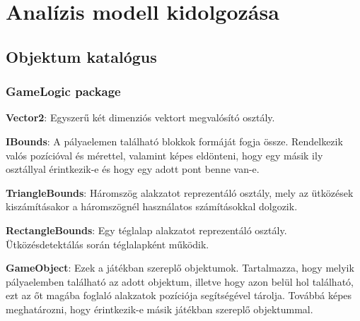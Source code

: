 


\setcounter{section}{3}




\fedlap

\section{Analízis modell kidolgozása}

\subsection{Objektum katalógus}

\subsubsection{GameLogic package}

\textbf{Vector2}: Egyszerű két dimenziós vektort megvalósító osztály.

\textbf{IBounds}: A pályaelemen található blokkok formáját fogja össze. Rendelkezik valós pozícióval és mérettel, valamint képes eldönteni, hogy egy másik ily osztállyal érintkezik-e és hogy egy adott pont benne van-e.

\textbf{TriangleBounds}: Háromszög alakzatot reprezentáló osztály, mely az ütközések kiszámításakor a háromszögnél használatos számításokkal dolgozik.

\textbf{RectangleBounds}: Egy téglalap alakzatot reprezentáló osztály. Ütközésdetektálás során téglalapként működik.

\textbf{GameObject}: Ezek a játékban szereplő objektumok. Tartalmazza, hogy melyik pályaelemben található az adott objektum, illetve hogy azon belül hol található, ezt az őt magába foglaló alakzatok pozíciója segítségével tárolja. Továbbá képes meghatározni, hogy érintkezik-e másik játékban szereplő objektummal.

